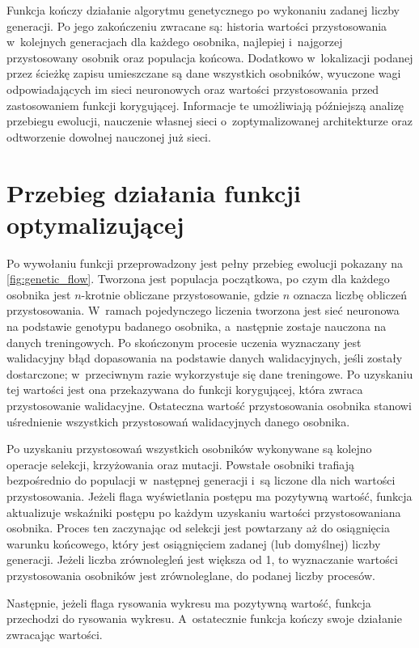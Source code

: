 Funkcja kończy działanie algorytmu genetycznego
po wykonaniu zadanej liczby generacji.
Po jego zakończeniu zwracane są:
historia wartości przystosowania w~kolejnych
generacjach dla każdego osobnika,
najlepiej i~najgorzej przystosowany
osobnik oraz populacja końcowa.
Dodatkowo w~lokalizacji podanej przez ścieżkę
zapisu umieszczane są dane wszystkich osobników,
wyuczone wagi odpowiadających im sieci neuronowych
oraz wartości przystosowania przed
zastosowaniem funkcji korygującej.
Informacje te umożliwiają późniejszą analizę
przebiegu ewolucji, nauczenie własnej sieci
o~zoptymalizowanej architekturze
oraz odtworzenie dowolnej nauczonej już sieci.

\section{Przebieg działania funkcji optymalizującej}
Po wywołaniu funkcji przeprowadzony jest pełny przebieg
ewolucji pokazany na \cref{fig:genetic_flow}.
Tworzona jest populacja początkowa,
po czym dla każdego osobnika jest
$n$-krotnie obliczane przystosowanie,
gdzie $n$ oznacza liczbę obliczeń przystosowania.
W~ramach pojedynczego liczenia tworzona jest
sieć neuronowa na podstawie genotypu badanego osobnika,
a~następnie zostaje nauczona na danych treningowych.
Po skończonym procesie uczenia wyznaczany
jest walidacyjny błąd dopasowania 
na podstawie danych walidacyjnych,
jeśli zostały dostarczone;
w~przeciwnym razie wykorzystuje się dane treningowe.
Po uzyskaniu tej wartości jest ona
przekazywana do funkcji korygującej,
która zwraca przystosowanie walidacyjne.
Ostateczna wartość przystosowania osobnika
stanowi uśrednienie wszystkich przystosowań
walidacyjnych danego osobnika.

Po uzyskaniu przystosowań wszystkich
osobników wykonywane są kolejno operacje
selekcji, krzyżowania oraz mutacji.
Powstałe osobniki trafiają bezpośrednio
do populacji w~następnej generacji
i~są liczone dla nich wartości przystosowania.
Jeżeli flaga wyświetlania postępu ma pozytywną wartość,
funkcja aktualizuje wskaźniki postępu po każdym
uzyskaniu wartości przystosowaniana osobnika.
Proces ten zaczynając od selekcji jest powtarzany
aż do osiągnięcia warunku końcowego,
który jest osiągnięciem zadanej
(lub domyślnej) liczby generacji.
Jeżeli liczba zrównolegleń jest większa od 1,
to wyznaczanie wartości przystosowania
osobników jest zrównoleglane,
do podanej liczby procesów.

Następnie, jeżeli flaga rysowania
wykresu ma pozytywną wartość,
funkcja przechodzi do rysowania wykresu.
A~ostatecznie funkcja kończy swoje
działanie zwracając wartości.


